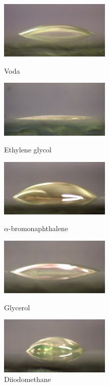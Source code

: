 \documentclass[12pt]{article}
\begin{document}
\begin{figure}[ht]
\begin{minipage}[b]{0.5\linewidth}
\centering
\includegraphics[width=200px]{img/w.jpeg}
\caption{Voda}
\label{fig:water}
\end{minipage}
\begin{minipage}[b]{0.5\linewidth}
\centering
\includegraphics[width=200px]{img/eg.jpeg}
\caption{Ethylene glycol}
\label{fig:eg}
\end{minipage}

\hspace{1.5cm}

\begin{minipage}[b]{0.5\linewidth}
\centering
\includegraphics[width=200px]{img/ab.jpeg}
\caption{$\alpha$-bromonaphthalene}
\label{fig:ab}
\end{minipage}
\begin{minipage}[b]{0.5\linewidth}
\centering
\includegraphics[width=200px]{img/g.jpeg}
\caption{Glycerol}
\label{fig:g}
\end{minipage}

\hspace{1.5cm}

\begin{minipage}[b]{1\linewidth}
\centering
\includegraphics[width=200px]{img/d.jpeg}
\caption{Diiodomethane}
\label{fig:d}
\end{minipage}
\end{figure}
\end{document}
